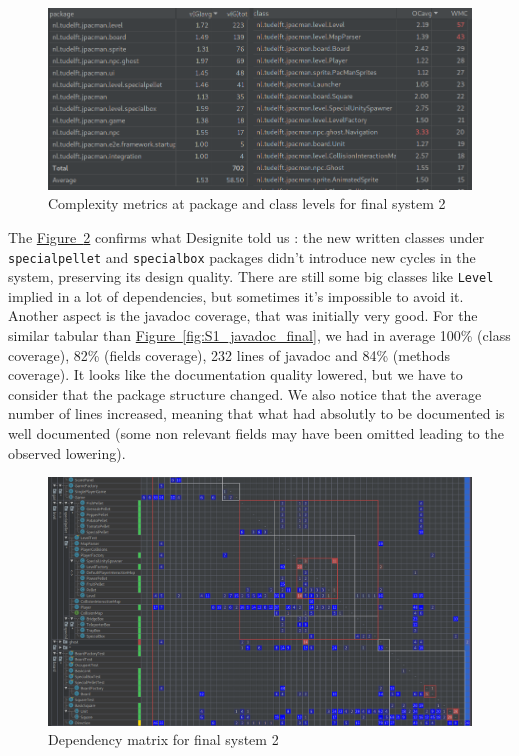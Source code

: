 \documentclass[]{article}
\newcommand{\wordlink}[2]{\hyperref[#2]{#1~\ref{#2}}}
\begin{document}
\begin{figure}[h]
\centering
\includegraphics[width=\linewidth]{S1-compl_final}
\caption{Complexity metrics at package and class levels for final system 2}
\label{fig:S1_compl_final}
\end{figure}

\vspace{0.8cm}

The \wordlink{Figure}{fig:S1_depmatrix_final} confirms what Designite told us : the new written classes under \texttt{specialpellet} and \texttt{specialbox} packages didn't introduce new cycles in the system, preserving its design quality. There are still some big classes like \texttt{Level} implied in a lot of dependencies, but sometimes it's impossible to avoid it. \\

Another aspect is the javadoc coverage, that was initially very good. For the similar tabular than \wordlink{Figure}{fig:S1_javadoc_final}, we had in average 100\% (class coverage), 82\% (fields coverage), 232 lines of javadoc and 84\% (methods coverage). It looks like the documentation quality lowered, but we have to consider that the package structure changed. We also notice that the average number of lines increased, meaning that what had absolutly to be documented is well documented (some non relevant fields may have been omitted leading to the observed lowering).

\newpage

\vspace{0.2cm}

\begin{figure}[h]
\centering
\includegraphics[width=0.95\linewidth]{S1-depmatrix_final}
\caption{Dependency matrix for final system 2}
\label{fig:S1_depmatrix_final}
\end{figure}
\end{document}
